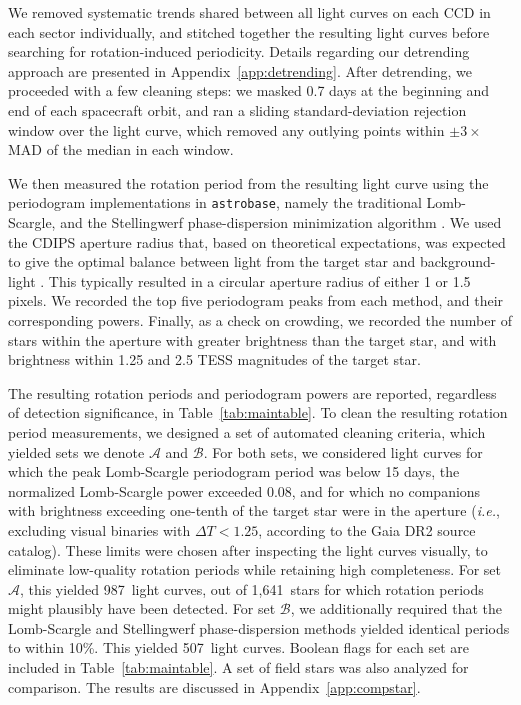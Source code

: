 \documentclass[12pt,twocolumn,tighten]{aastex63}
\newcommand{\nautorotdenominator}{1{,}641} %
\newcommand{\nautorotnumerator}{987} %
\newcommand{\nautorotnumeratormatching}{507} %
\begin{document}
We removed systematic trends shared between all light curves on each
CCD in each sector individually, and stitched together the resulting
light curves before searching for rotation-induced periodicity.
Details regarding our detrending approach are presented in
Appendix~\ref{app:detrending}.  After detrending, we proceeded with a
few cleaning steps: we masked 0.7 days at the beginning and end of
each spacecraft orbit, and ran a sliding standard-deviation rejection
window over the light curve, which removed any outlying points within
$\pm3\times$MAD of the median in each window.

We then measured the rotation period from the resulting light curve
using the periodogram implementations in \texttt{astrobase}, namely
the traditional Lomb-Scargle, and the Stellingwerf phase-dispersion
minimization algorithm
\citep{lomb_1976,stellingwerf_period_1978,scargle_studies_1982,stellingwerf_period_2011,bhatti_astrobase_2018}.
We used the CDIPS aperture radius that, based on theoretical
expectations, was expected to give the optimal balance between light
from the target star and background-light \citep{Sullivan_2015}.  This
typically resulted in a circular aperture radius of either 1 or 1.5 pixels.
We recorded the top five periodogram peaks from each method, and their
corresponding powers.  Finally, as a check on crowding, we recorded
the number of stars within the aperture with greater
brightness than the target star, and with brightness within 1.25 and
2.5 TESS magnitudes of the target star.

The resulting rotation periods and periodogram powers are reported,
regardless of detection significance, in Table~\ref{tab:maintable}.
To clean the resulting rotation period measurements, we designed a set
of automated cleaning criteria, which yielded sets we denote
$\mathcal{A}$ and $\mathcal{B}$.  For both sets, we considered light
curves for which the peak Lomb-Scargle periodogram period was below 15
days, the normalized Lomb-Scargle power exceeded 0.08, and for which
no companions with brightness exceeding one-tenth of the target star
were in the aperture ({\it i.e.}, excluding visual binaries
with $\Delta T < 1.25$, according to the Gaia DR2 source catalog).
These limits were chosen after inspecting the light curves visually,
to eliminate low-quality rotation periods while retaining high
completeness.  For set $\mathcal{A}$, this yielded \nautorotnumerator\
light curves, out of \nautorotdenominator\ stars for which rotation
periods might plausibly have been detected.  For set $\mathcal{B}$, we
additionally required that the Lomb-Scargle and Stellingwerf
phase-dispersion methods yielded identical periods to within 10\%.
This yielded \nautorotnumeratormatching\ light curves.  Boolean flags
for each set are included in Table~\ref{tab:maintable}.
A set of field stars was also analyzed for comparison.
The results are discussed in Appendix~\ref{app:compstar}.
\end{document}
